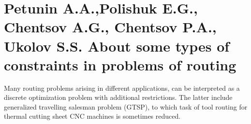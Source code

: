 \part{Petunin A.A.,Polishuk E.G., Chentsov A.G., Chentsov P.A., Ukolov S.S.
About some types of constraints in problems of routing}

Many routing problems arising in different applications,
can be interpreted as a discrete optimization problem with additional restrictions.
The latter include generalized travelling salesman problem (GTSP),
to which task of tool routing for thermal cutting sheet CNC machines
is sometimes reduced.
